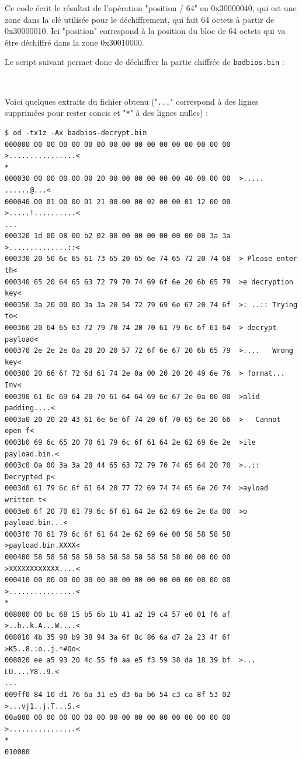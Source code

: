 \documentclass[a4paper,10pt]{article}
\newcommand{\pyinput}[1]{%
    \noindent{\color[rgb]{0.5, 0.5, 0.5}{\rule{\textwidth}{0.4pt}}}
     \\
    \noindent{\color[rgb]{0.5, 0.5, 0.5}{\rule{\textwidth}{0.4pt}}}
}
\begin{document}
Ce code écrit le résultat de l'opération "position / 64" en 0x30000040, qui est une zone dans la clé utilisée pour le déchiffrement, qui fait 64 octets à partir de 0x30000010. Ici "position" correspond à la position du bloc de 64 octets qui va être déchiffré dans la zone 0x30010000.

Le script suivant permet donc de déchiffrer la partie chiffrée de \texttt{badbios.bin} :

\pyinput{2_arm64/decrypt_badbios_mem.py.inc.tex}

Voici quelques extraits du fichier obtenu ("\texttt{...}" correspond à des lignes supprimées pour rester concis et "\texttt{*}" à des lignes nulles) :
\begin{verbatim}
$ od -tx1z -Ax badbios-decrypt.bin
000000 00 00 00 00 00 00 00 00 00 00 00 00 00 00 00 00  >................<
*
000030 00 00 00 00 00 20 00 00 00 00 00 00 40 00 00 00  >..... ......@...<
000040 00 01 00 00 01 21 00 00 00 02 00 00 01 12 00 00  >.....!..........<
...
000320 1d 00 08 00 b2 02 00 00 00 00 00 00 00 00 3a 3a  >..............::<
000330 20 50 6c 65 61 73 65 20 65 6e 74 65 72 20 74 68  > Please enter th<
000340 65 20 64 65 63 72 79 70 74 69 6f 6e 20 6b 65 79  >e decryption key<
000350 3a 20 00 00 3a 3a 20 54 72 79 69 6e 67 20 74 6f  >: ..:: Trying to<
000360 20 64 65 63 72 79 70 74 20 70 61 79 6c 6f 61 64  > decrypt payload<
000370 2e 2e 2e 0a 20 20 20 57 72 6f 6e 67 20 6b 65 79  >....   Wrong key<
000380 20 66 6f 72 6d 61 74 2e 0a 00 20 20 20 49 6e 76  > format...   Inv<
000390 61 6c 69 64 20 70 61 64 64 69 6e 67 2e 0a 00 00  >alid padding....<
0003a0 20 20 20 43 61 6e 6e 6f 74 20 6f 70 65 6e 20 66  >   Cannot open f<
0003b0 69 6c 65 20 70 61 79 6c 6f 61 64 2e 62 69 6e 2e  >ile payload.bin.<
0003c0 0a 00 3a 3a 20 44 65 63 72 79 70 74 65 64 20 70  >..:: Decrypted p<
0003d0 61 79 6c 6f 61 64 20 77 72 69 74 74 65 6e 20 74  >ayload written t<
0003e0 6f 20 70 61 79 6c 6f 61 64 2e 62 69 6e 2e 0a 00  >o payload.bin...<
0003f0 70 61 79 6c 6f 61 64 2e 62 69 6e 00 58 58 58 58  >payload.bin.XXXX<
000400 58 58 58 58 58 58 58 58 58 58 58 58 00 00 00 00  >XXXXXXXXXXXX....<
000410 00 00 00 00 00 00 00 00 00 00 00 00 00 00 00 00  >................<
*
008000 00 bc 68 15 b5 6b 1b 41 a2 19 c4 57 e0 01 f6 af  >..h..k.A...W....<
008010 4b 35 98 b9 38 94 3a 6f 8c 86 6a d7 2a 23 4f 6f  >K5..8.:o..j.*#Oo<
008020 ee a5 93 20 4c 55 f0 aa e5 f3 59 38 da 18 39 bf  >... LU....Y8..9.<
...
009ff0 84 10 d1 76 6a 31 e5 d3 6a b6 54 c3 ca 8f 53 02  >...vj1..j.T...S.<
00a000 00 00 00 00 00 00 00 00 00 00 00 00 00 00 00 00  >................<
*
010000
\end{verbatim}
\end{document}
